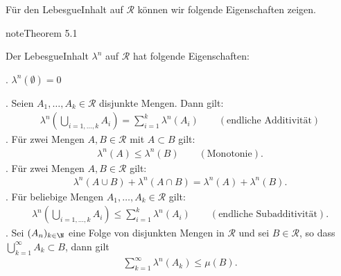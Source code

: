 \documentclass[letterpaper,10pt,german]{jupyterBook}
\begin{document}
\sphinxAtStartPar
Für den Lebesgue\sphinxhyphen{}Inhalt auf \(\mathcal{R}\) können wir folgende Eigenschaften zeigen.
\label{masstheorie/masstheorie:thm:lebesguevolume}
\begin{sphinxadmonition}{note}{Theorem 5.1}



\sphinxAtStartPar
Der Lebesgue\sphinxhyphen{}Inhalt \(\lambda^n\) auf \(\mathcal{R}\) hat folgende Eigenschaften:

. \(\lambda^n(\emptyset) = 0\)

. Seien \(A_1, \ldots, A_k \in \mathcal{R}\) disjunkte Mengen.
Dann gilt:
\begin{equation*}
\begin{split}\lambda^n \left( \bigcup_{i=1,\ldots,k} A_i \right) = \sum_{i=1}^k \lambda^n(A_i) \qquad (\text{endliche Additivität})\end{split}
\end{equation*}
. Für zwei Mengen \(A, B \in \mathcal{R}\) mit \(A \subset B\) gilt:
\begin{equation*}
\begin{split}\lambda^n(A) \leq \lambda^n(B) \qquad (\text{Monotonie}).\end{split}
\end{equation*}
. Für zwei Mengen \(A, B \in \mathcal{R}\) gilt:
\begin{equation*}
\begin{split}\lambda^n(A \cup B) + \lambda^n(A \cap B) = \lambda^n(A) + \lambda^n(B).\end{split}
\end{equation*}
. Für beliebige Mengen \(A_1, \ldots, A_k \in \mathcal{R}\) gilt:
\begin{equation*}
\begin{split}\lambda^n\left( \bigcup_{i=1,\ldots,k} A_i\right) \leq \sum_{i=1}^k \lambda^n(A_i) \qquad (\text{endliche Subadditivität}).\end{split}
\end{equation*}
. Sei \((A_n)_{k\in\N}\) eine Folge von disjunkten Mengen in \(\mathcal{R}\) und sei \(B \in \mathcal{R}\), so dass \(\bigcup_{k=1}^\infty A_k \subset B\), dann gilt
\begin{equation*}
\begin{split}\sum_{k=1}^\infty  \lambda^n(A_k) \leq \mu(B).\end{split}
\end{equation*}\end{sphinxadmonition}
\end{document}
